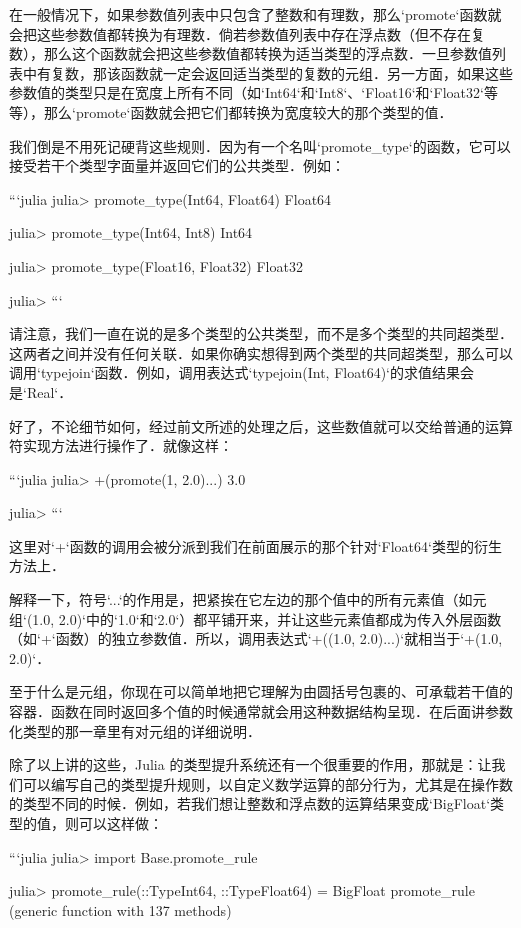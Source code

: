在一般情况下，如果参数值列表中只包含了整数和有理数，那么`promote`函数就会把这些参数值都转换为有理数．倘若参数值列表中存在浮点数（但不存在复数），那么这个函数就会把这些参数值都转换为适当类型的浮点数．一旦参数值列表中有复数，那该函数就一定会返回适当类型的复数的元组．另一方面，如果这些参数值的类型只是在宽度上所有不同（如`Int64`和`Int8`、`Float16`和`Float32`等等），那么`promote`函数就会把它们都转换为宽度较大的那个类型的值．

我们倒是不用死记硬背这些规则．因为有一个名叫`promote_type`的函数，它可以接受若干个类型字面量并返回它们的公共类型．例如：

```julia
julia> promote_type(Int64, Float64)
Float64

julia> promote_type(Int64, Int8)
Int64

julia> promote_type(Float16, Float32)
Float32

julia> 
```

请注意，我们一直在说的是多个类型的公共类型，而不是多个类型的共同超类型．这两者之间并没有任何关联．如果你确实想得到两个类型的共同超类型，那么可以调用`typejoin`函数．例如，调用表达式`typejoin(Int, Float64)`的求值结果会是`Real`．

好了，不论细节如何，经过前文所述的处理之后，这些数值就可以交给普通的运算符实现方法进行操作了．就像这样：

```julia
julia> +(promote(1, 2.0)...)
3.0

julia> 
```

这里对`+`函数的调用会被分派到我们在前面展示的那个针对`Float64`类型的衍生方法上．

解释一下，符号`...`的作用是，把紧挨在它左边的那个值中的所有元素值（如元组`(1.0, 2.0)`中的`1.0`和`2.0`）都平铺开来，并让这些元素值都成为传入外层函数（如`+`函数）的独立参数值．所以，调用表达式`+((1.0, 2.0)...)`就相当于`+(1.0, 2.0)`．

至于什么是元组，你现在可以简单地把它理解为由圆括号包裹的、可承载若干值的容器．函数在同时返回多个值的时候通常就会用这种数据结构呈现．在后面讲参数化类型的那一章里有对元组的详细说明．

除了以上讲的这些，Julia 的类型提升系统还有一个很重要的作用，那就是：让我们可以编写自己的类型提升规则，以自定义数学运算的部分行为，尤其是在操作数的类型不同的时候．例如，若我们想让整数和浮点数的运算结果变成`BigFloat`类型的值，则可以这样做：

```julia
julia> import Base.promote_rule

julia> promote_rule(::Type{Int64}, ::Type{Float64}) = BigFloat
promote_rule (generic function with 137 methods)

